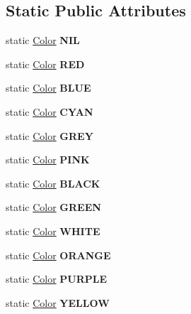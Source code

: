 \subsection*{Static Public Attributes}
\begin{DoxyCompactItemize}
\item 
\mbox{\label{struct_color_a7fe9e3e6eff4687b31026dbe6233cf26}} 
static \mbox{\hyperlink{struct_color}{Color}} {\bfseries N\+IL}
\item 
\mbox{\label{struct_color_abe0e77f1bd12cb0e98b4d5650009942c}} 
static \mbox{\hyperlink{struct_color}{Color}} {\bfseries R\+ED}
\item 
\mbox{\label{struct_color_a5a1557101e389271fe14dceef583799a}} 
static \mbox{\hyperlink{struct_color}{Color}} {\bfseries B\+L\+UE}
\item 
\mbox{\label{struct_color_aac281bf6e998aeef6f7e7c0c7df8dc34}} 
static \mbox{\hyperlink{struct_color}{Color}} {\bfseries C\+Y\+AN}
\item 
\mbox{\label{struct_color_ab458fc5816bb03bb6a8b6feae28dad09}} 
static \mbox{\hyperlink{struct_color}{Color}} {\bfseries G\+R\+EY}
\item 
\mbox{\label{struct_color_a0b2cc548cde49a675a2b738f50bb6f2b}} 
static \mbox{\hyperlink{struct_color}{Color}} {\bfseries P\+I\+NK}
\item 
\mbox{\label{struct_color_a6f7dc225ef0b3dde655cbf925cad882d}} 
static \mbox{\hyperlink{struct_color}{Color}} {\bfseries B\+L\+A\+CK}
\item 
\mbox{\label{struct_color_a5b9aafb544d41992e367b065e6595143}} 
static \mbox{\hyperlink{struct_color}{Color}} {\bfseries G\+R\+E\+EN}
\item 
\mbox{\label{struct_color_aafb827ace5780d74f0c513ce92077853}} 
static \mbox{\hyperlink{struct_color}{Color}} {\bfseries W\+H\+I\+TE}
\item 
\mbox{\label{struct_color_a72b2b3a255691d4dffa4ed993e17098d}} 
static \mbox{\hyperlink{struct_color}{Color}} {\bfseries O\+R\+A\+N\+GE}
\item 
\mbox{\label{struct_color_a130287f8f4e91c9c567ea0cc27f5f012}} 
static \mbox{\hyperlink{struct_color}{Color}} {\bfseries P\+U\+R\+P\+LE}
\item 
\mbox{\label{struct_color_ad7b2412aba74d8d4b5e6d6dc7627264d}} 
static \mbox{\hyperlink{struct_color}{Color}} {\bfseries Y\+E\+L\+L\+OW}
\end{DoxyCompactItemize}


